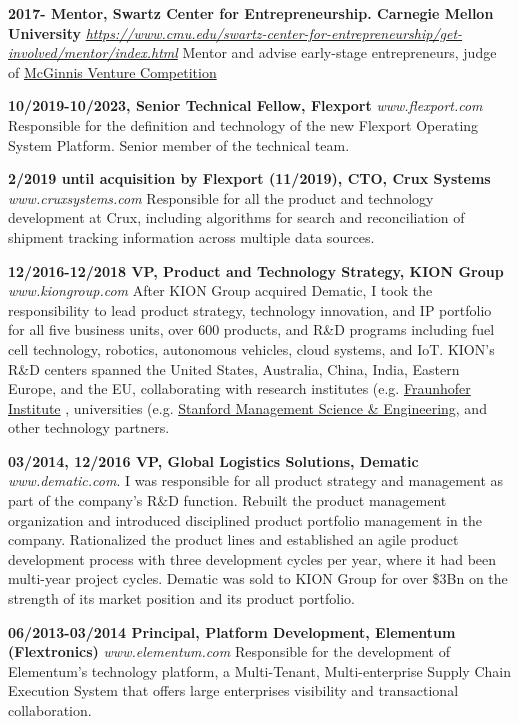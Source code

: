 \documentclass{res}
\begin{document}
\begin{resume}
{\bf 2017- Mentor, Swartz Center for Entrepreneurship. Carnegie Mellon University} \href{https://www.cmu.edu/swartz-center-for-entrepreneurship/get-involved/mentor/mentors-bio-pages/pinilla.html}{\it https://www.cmu.edu/swartz-center-for-entrepreneurship/get-involved/mentor/index.html} Mentor and advise early-stage entrepreneurs, judge of \href{https://www.cmu.edu/swartz-center-for-entrepreneurship/events/mcginnis-venture-competition/index.html}{McGinnis Venture Competition}

{\bf 10/2019-10/2023, Senior Technical Fellow, Flexport} {\it www.flexport.com} Responsible for the definition and technology of the new Flexport Operating System Platform. Senior member of the technical team.

{\bf 2/2019 until acquisition by Flexport (11/2019), CTO, Crux Systems} {\it www.cruxsystems.com} Responsible for all the product and technology development at Crux, including algorithms for search and reconciliation of shipment tracking information across multiple data sources.

{\bf 12/2016-12/2018 VP, Product and Technology Strategy, KION Group} {\it www.kiongroup.com}
After KION Group acquired Dematic, I took the responsibility to lead product strategy, technology innovation, and IP portfolio for all five business units, over 600 products, and R\&D programs including fuel cell technology, robotics, autonomous vehicles, cloud systems, and IoT. KION's R\&D centers spanned the United States, Australia, China, India, Eastern Europe, and the EU, collaborating with research institutes (e.g. \href{https://www.fraunhofer.de/en.html}{Fraunhofer Institute} , universities (e.g. \href{https://msande.stanford.edu/}{Stanford Management Science \& Engineering}, and other technology partners.

{\bf  03/2014, 12/2016 VP, Global Logistics Solutions, Dematic} {\it www.dematic.com}. I was responsible for all product strategy and management as part of the company's R\&D function. Rebuilt the product management organization and introduced disciplined product portfolio management in the company. Rationalized the product lines and established an agile product development process with three development cycles per year, where it had been multi-year project cycles. Dematic was sold to KION Group for over \$3Bn on the strength of its market position and its product portfolio.

{\bf  06/2013-03/2014 Principal, Platform Development, Elementum (Flextronics)}\newline
{\it www.elementum.com} Responsible for the development of Elementum's technology platform, a Multi-Tenant, Multi-enterprise Supply Chain Execution System that offers large enterprises visibility and transactional collaboration.


\end{resume}
\end{document}
